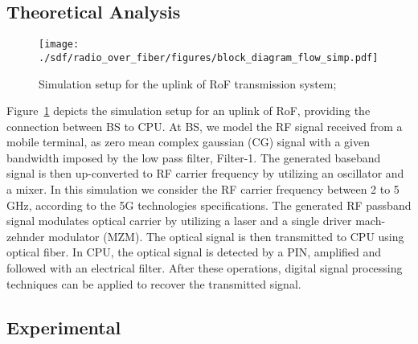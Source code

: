 \subsection{Theoretical Analysis}
\begin{figure}[h!]
    \centering
    \texttt{[image: ./sdf/radio\_over\_fiber/figures/block\_diagram\_flow\_simp.pdf]}
    \caption{Simulation setup for the uplink of RoF transmission system; }
    \label{fig_RoFdiagram}
\end{figure}

 Figure~\ref{fig_RoFdiagram} depicts the simulation setup for an uplink of RoF, providing the connection between BS to CPU. At BS, we model the RF signal received from a mobile terminal, as zero mean complex gaussian (CG) signal with a given bandwidth imposed by the low pass filter, Filter-1. The generated baseband signal is then up-converted to RF carrier frequency by utilizing an oscillator and a mixer. In this simulation we consider the RF carrier frequency between 2 to 5 GHz, according to the 5G technologies specifications. The generated RF passband signal modulates optical carrier by utilizing a laser and a single driver mach-zehnder modulator (MZM). The optical signal is then transmitted to CPU using optical fiber. In CPU, the optical signal is detected by a PIN, amplified and followed with an electrical filter. After these operations, digital signal processing techniques can be applied to recover the transmitted signal.




\subsection{Experimental}
